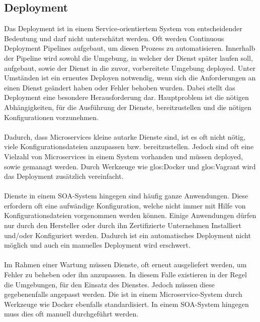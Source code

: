 \subsection{Deployment}
\label{subsec:Deployment}
Das Deployment ist in einem Service-orientiertem System von entscheidender Bedeutung und darf nicht unterschätzt werden. Oft werden Continuous Deployment Pipelines aufgebaut, um diesen Prozess zu automatisieren. Innerhalb der Pipeline wird sowohl die Umgebung, in welcher der Dienst später laufen soll, aufgebaut, sowie der Dienst in die zuvor, vorbereitete Umgebung deployed. Unter Umständen ist ein erneutes Deployen notwendig, wenn sich die Anforderungen an einen Dienst geändert haben oder Fehler behoben wurden. Dabei stellt das Deployment eine besondere Herausforderung dar. Hauptproblem ist die nötigen Abhängigkeiten, für die Ausführung der Dienste, bereitzustellen und die nötigen Konfigurationen vorzunehmen.
\\\\
Dadurch, dass Microservices kleine autarke Dienste sind, ist es oft nicht nötig, viele Konfigurationsdateien anzupassen bzw. bereitzustellen. Jedoch sind oft eine Vielzahl von Microservices in einem System vorhanden und müssen deployed, sowie gemanagt werden. Durch Werkzeuge wie \gls{glos:Docker} und \gls{glos:Vagrant} wird das Deployment zusätzlich vereinfacht. 
\\\\
Dienste in einem SOA-System hingegen sind häufig ganze Anwendungen. Diese erfordern oft eine aufwändige Konfiguration, welche nicht immer mit Hilfe von Konfigurationsdateien vorgenommen werden können. Einige Anwendungen dürfen nur durch den Hersteller oder durch ihn Zertifizierte Unternehmen Installiert und/oder Konfiguriert werden. Dadurch ist ein automatisches Deployment nicht möglich und auch ein manuelles Deployment wird erschwert.
\\\\
Im Rahmen einer Wartung müssen Dienste, oft erneut ausgeliefert werden, um Fehler zu beheben oder ihn anzupassen. In diesem Falle existieren in der Regel die Umgebungen, für den Einsatz des Dienstes. Jedoch müssen diese gegebenenfalls angepasst werden. Die ist in einem Microservice-System durch Werkzeuge wie Docker ebenfalls standardisiert. In einem SOA-System hingegen muss dies oft manuell durchgeführt werden.

